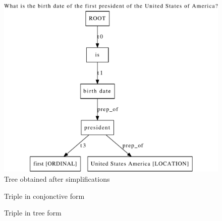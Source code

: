 \documentclass[a4paper,10pt]{report}
\begin{document}
\begin{figure}
\includegraphics[scale=0.6]{../examples_NLP_classical/after_simplification.pdf}
\caption{Tree obtained after simplifications}
\label{tree_after}
\end{figure}


\begin{figure}

\caption{Triple in conjonctive form}
\label{triple_conj}
\end{figure}

\begin{figure}

\caption{Triple in tree form}
\label{triple_tree}
\end{figure}



\nocite{*}
\end{document}

